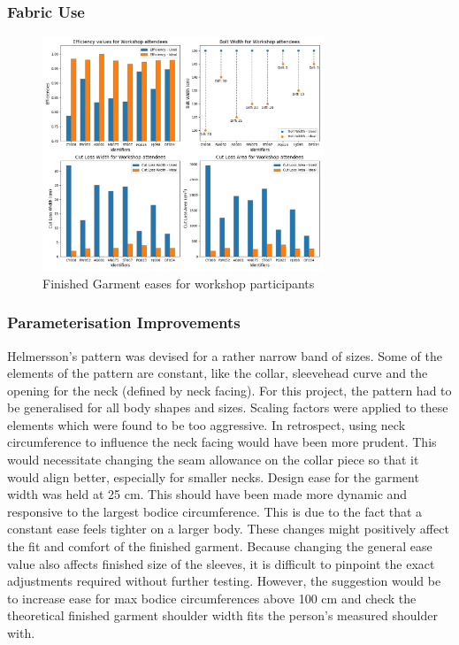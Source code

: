 \subsubsection{Fabric Use}
\begin{figure} [H] %
    \centering %
    \includegraphics[width = 0.75\textwidth]{Images/Workshop_Plot.png} %
    \caption{Finished Garment eases for workshop participants}
    \label{} %
\end{figure}

\subsubsection{Parameterisation Improvements}
Helmersson’s pattern was devised for a rather narrow band of sizes. Some of the elements of the pattern are constant, like the collar, sleevehead curve and the opening for the neck (defined by neck facing). For this project, the pattern had to be generalised for all body shapes and sizes. Scaling factors were applied to these elements which were found to be too aggressive. In retrospect, using neck circumference to influence the neck facing would have been more prudent. This would necessitate changing the seam allowance on the collar piece so that it would align better, especially for smaller necks.
Design ease for the garment width was held at 25 cm. This should have been made more dynamic and responsive to the largest bodice circumference. This is due to the fact that a constant ease feels tighter on a larger body. These changes might positively affect the fit and comfort of the finished garment. Because changing the general ease value also affects finished size of the sleeves, it is difficult to pinpoint the exact adjustments required without further testing. However, the suggestion would be to increase ease for max bodice circumferences above 100 cm and check the theoretical finished garment shoulder width fits the person's measured shoulder with.

